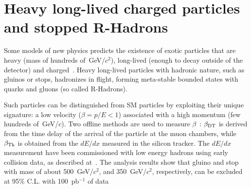 \documentclass{cmspaper}
\begin{document}
\section{Heavy long-lived charged particles and stopped R-Hadrons} \label{HSCP}
Some models of new physics predicts the existence 
of exotic particles that are heavy (mass of hundreds of~GeV/$c^2$), 
long-lived (enough to decay outside of the detector) and charged~\cite{Fairbairn:2006gg}. 
Heavy long-lived particles with hadronic nature, such as gluinos or stops, 
hadronizes in flight, forming meta-stable bounded states with quarks and gluons (so called R-Hadrons).

Such particles can be distinguished from SM particles
by exploiting their unique signature: a low velocity ($\beta=p/E<1$) 
associated with a high momentum (few hundreds of~GeV/$c$).
Two offline methods are used to measure $\beta$~\cite{HSCP}:
$\beta_{{\rm DT}}$ is derived from the time delay of the arrival of the particle
at the muon chambers, while $\beta_{{\rm Tk}}$ is obtained from the $dE/dx$ 
measured in the silicon tracker.
The $dE/dx$ measurement have been commissioned with low energy hadrons 
using early collision data, as described at~\cite{TRACKERPAS}.
The analysis results show that gluino and stop 
with mass of about 500~GeV/$c^2$, and 350~GeV/$c^2$, 
respectively, can be excluded at 95\% C.L. with 100~pb$^{-1}$ of data
\end{document}
